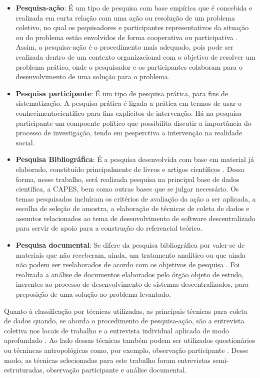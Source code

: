 \begin{itemize}
	\item \textbf{Pesquisa-ação}: É um tipo de pesquisa com base empírica que é concebida e realizada em curta relação com uma ação ou resolução de um problema coletivo, no qual os pequisadores e participantes representativos da situação ou do problema estão envolvidos de forma cooperativa ou participativa \cite{thiollent2011metodologia}. Assim, a pesquisa-ação é o procedimento mais adequado, pois pode ser realizada dentro de um contexto organizacional com o objetivo de resolver um problema prático, onde o pesquisador e os participantes colaboram para o desenvolvimento de uma solução para o problema.
	\item \textbf{Pesquisa participante}: É um tipo de pesquisa prática, para fins de sistematização. A pesquisa prática é ligada a prática em termos de usar o conhecimentocientífico para fins explícitos de intervenção. Há na pesquisa participante um compoente político que possibilita discutir a importância do processo de investigação, tendo em pesperctiva a intervenção na realidade social.
	\item \textbf{Pesquisa Bibliográfica}: É a pesquisa desenvolvida com base em
	material já elaborado, constituído principalmente de livros e artigos científicos \cite{gil2002}. Dessa forma, nesse trabalho, será realizada pesquisa na principal base de dados científica, a CAPES, bem como outras bases que se julgar necessário. Os temas pesquisados incluíram os critérios de avaliação da ação a ser aplicada, a escolha de seleção de amostra, a elaboração de técnicas de coleta de dados e assuntos relacionados ao tema de desenvolvimento de software descentralizado para servir de apoio para a construção do referencial teórico.
	\item \textbf{Pesquisa documental}: Se difere da pesquisa bibliográfica por valer-se de materiais que não receberam, ainda, um tratamento analítico ou que ainda não podem ser reelaborados de acordo com os objetivos de pesquisa \cite{gil2002}. Foi realizada a análise de documentos elaborados pelo órgão objeto de estudo, inerentes ao processo de desenvolvimento de sistemas descentralizados, para preposição de uma solução ao problema levantado.
\end{itemize}

Quanto à classificação por técnicas utilizadas, as principais técnicas para coleta de dados quando, se aborda o procedimento de pesquisa-ação, são a entrevista coletiva nos locais de trabalho e a entrevista individual aplicada de modo aprofundado \cite{thiollent2011metodologia}. Ao lado dessas técnicas também podem ser utilizados questionários ou técnincas antropológicas como, por exemplo, observação participante \cite{thiollent2011metodologia}. Desse modo, as técnicas selecionadas para este trabalho foram entrevistas semi-estruturadas, observação participante e análise documental.

